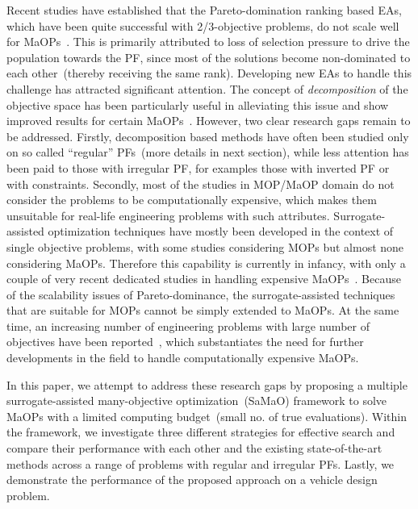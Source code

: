 \documentclass[twocolumn,10pt]{asme2ej}
\begin{document}
Recent studies have established that the Pareto-domination ranking based EAs, which have been quite successful with 2/3-objective problems, do not scale well for MaOPs~\cite{KHTishibuchi2008evolutionary}. This is primarily attributed to loss of selection pressure to drive the population towards the PF, since most of the solutions become non-dominated to each other~(thereby receiving the same rank). Developing new EAs to handle this challenge has attracted significant attention. {\color{blue}The concept of \textit{decomposition} of the objective space} has been particularly useful in alleviating this issue and show improved results for certain MaOPs~\cite{KHTtrivedisurvey}. However, two clear research gaps remain to be addressed. Firstly, decomposition based methods have often been studied only on so called ``regular'' PFs~(more details in next section), while less attention has been paid to those with irregular PF, for examples those with inverted PF or with constraints. Secondly, most of the studies in MOP/MaOP domain do not consider the problems to be computationally expensive, which makes them unsuitable for real-life engineering problems with such attributes. Surrogate-assisted optimization techniques have mostly been developed in the context of single objective problems, with some studies considering MOPs but almost none considering MaOPs. Therefore this capability is currently in infancy, with only a couple of very recent dedicated studies in handling expensive MaOPs~\cite{KHTchugh2016krvea,KHTchugh2016const}. Because of the scalability issues of Pareto-dominance, the surrogate-assisted techniques that are suitable for MOPs cannot be simply extended to MaOPs. At the same time, an increasing number of engineering problems with large number of objectives have been reported~\cite{KHTjmd2017,Asafuddoula2015}, which substantiates the need for further developments in the field to handle computationally expensive MaOPs.  

In this paper, we attempt to address these research gaps by proposing a multiple surrogate-assisted many-objective optimization~(SaMaO) framework to solve MaOPs with a limited computing budget~(small no. of true evaluations). Within the framework, we investigate three different strategies for effective search and compare their performance with each other and the existing state-of-the-art methods across a range of problems with regular and irregular PFs. Lastly, we demonstrate the performance of the proposed approach on a {\color{blue}vehicle design} problem. 
\end{document}

